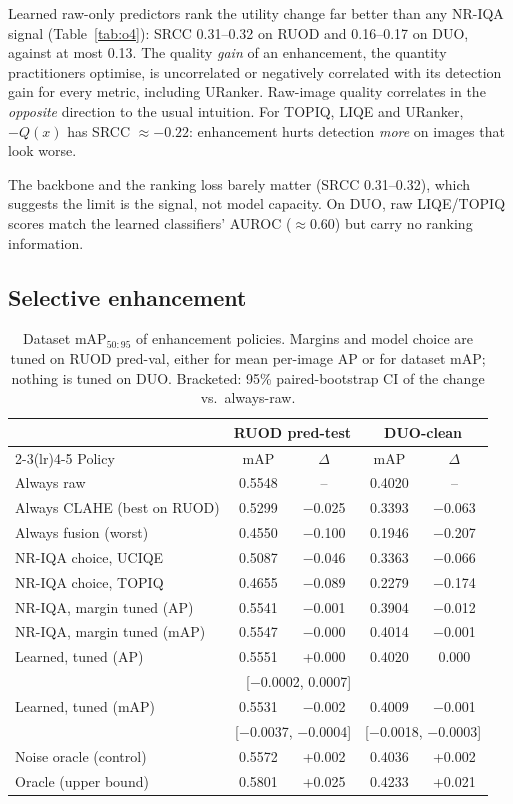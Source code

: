 \documentclass[conference]{IEEEtran}
\begin{document}
Learned raw-only predictors rank the utility change far better than any NR-IQA signal (Table~\ref{tab:o4}): SRCC 0.31--0.32 on RUOD and 0.16--0.17 on DUO, against at most 0.13. The quality \emph{gain} of an enhancement, the quantity practitioners optimise, is uncorrelated or negatively correlated with its detection gain for every metric, including URanker. Raw-image quality correlates in the \emph{opposite} direction to the usual intuition. For TOPIQ, LIQE and URanker, $-Q(x)$ has SRCC $\approx-0.22$: enhancement hurts detection \emph{more} on images that look worse.

The backbone and the ranking loss barely matter (SRCC 0.31--0.32), which suggests the limit is the signal, not model capacity. On DUO, raw LIQE/TOPIQ scores match the learned classifiers' AUROC ($\approx$0.60) but carry no ranking information.

\subsection{Selective enhancement}
\begin{table}[t]
\centering
\caption{Dataset mAP$_{50:95}$ of enhancement policies. Margins and model choice are tuned on RUOD pred-val, either for mean per-image AP or for dataset mAP; nothing is tuned on DUO. Bracketed: 95\% paired-bootstrap CI of the change vs.\ always-raw.}
\label{tab:o5}
\setlength{\tabcolsep}{2.6pt}
\footnotesize
\begin{tabular}{@{}lcccc@{}}
\toprule
 & \multicolumn{2}{c}{RUOD pred-test} & \multicolumn{2}{c}{DUO-clean} \\
\cmidrule(lr){2-3}\cmidrule(lr){4-5}
Policy & mAP & $\Delta$ & mAP & $\Delta$ \\
\midrule
Always raw & 0.5548 & -- & 0.4020 & -- \\
Always CLAHE (best on RUOD) & 0.5299 & $-$0.025 & 0.3393 & $-$0.063 \\
Always fusion (worst) & 0.4550 & $-$0.100 & 0.1946 & $-$0.207 \\
NR-IQA choice, UCIQE & 0.5087 & $-$0.046 & 0.3363 & $-$0.066 \\
NR-IQA choice, TOPIQ & 0.4655 & $-$0.089 & 0.2279 & $-$0.174 \\
NR-IQA, margin tuned (AP) & 0.5541 & $-$0.001 & 0.3904 & $-$0.012 \\
NR-IQA, margin tuned (mAP) & 0.5547 & $-$0.000 & 0.4014 & $-$0.001 \\
Learned, tuned (AP) & 0.5551 & +0.000 & 0.4020 & 0.000 \\
 & \multicolumn{2}{r}{\scriptsize{}[$-$0.0002, 0.0007]} & & \\
Learned, tuned (mAP) & 0.5531 & $-$0.002 & 0.4009 & $-$0.001 \\
 & \multicolumn{2}{r}{\scriptsize{}[$-$0.0037, $-$0.0004]} & \multicolumn{2}{r}{\scriptsize{}[$-$0.0018, $-$0.0003]} \\
Noise oracle (control) & 0.5572 & +0.002 & 0.4036 & +0.002 \\
Oracle (upper bound) & 0.5801 & +0.025 & 0.4233 & +0.021 \\
\bottomrule
\end{tabular}
\end{table}
\end{document}

